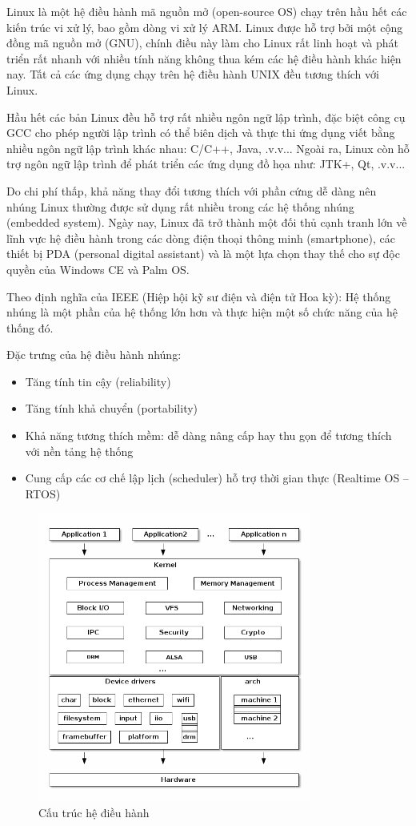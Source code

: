 
Linux là một hệ điều hành mã nguồn mở (open-source OS) chạy trên hầu hết các kiến trúc vi xử lý, bao gồm dòng vi xử lý ARM. Linux được hỗ trợ bởi một cộng đồng mã nguồn mở (GNU), chính điều này làm cho Linux rất linh hoạt và phát triển rất nhanh với nhiều tính năng không thua kém các hệ điều hành khác hiện nay. Tất cả các ứng dụng chạy trên hệ điều hành UNIX đều tương thích với Linux.

Hầu hết các bản Linux đều hỗ trợ rất nhiều ngôn ngữ lập trình, đặc biệt công cụ GCC cho phép người lập trình có thể biên dịch và thực thi ứng dụng viết bằng nhiều ngôn ngữ lập trình khác nhau: C/C++, Java, .v.v... Ngoài ra, Linux còn hỗ trợ ngôn ngữ lập trình để phát triển các ứng dụng đồ họa như: JTK+, Qt, .v.v...

Do chi phí thấp, khả năng thay đổi tương thích với phần cứng dễ dàng nên nhúng Linux thường được sử dụng rất nhiều trong các hệ thống nhúng (embedded system). Ngày nay, Linux đã trở thành một đối thủ cạnh tranh lớn về lĩnh vực hệ điều hành trong các dòng điện thoại thông minh (smartphone), các thiết bị PDA (personal digital assistant) và là một lựa chọn thay thế cho sự độc quyền của Windows CE và Palm OS.

Theo định nghĩa của IEEE (Hiệp hội kỹ sư điện và điện tử Hoa kỳ): Hệ thống nhúng là một phần của hệ thống lớn hơn và thực hiện một số chức năng của hệ thống đó.

Đặc trưng của hệ điều hành nhúng:
\begin{itemize}
	\item Tăng tính tin cậy (reliability)
	\item Tăng tính khả chuyển (portability)
	\item Khả năng tương thích mềm: dễ dàng nâng cấp hay thu gọn để tương thích với nền tảng hệ thống
	\item Cung cấp các cơ chế lập lịch (scheduler) hỗ trợ thời gian thực (Realtime OS – RTOS)
\end{itemize}
\begin{figure}[H]
	\centering
	\includegraphics[width=0.8\textwidth]{../images/cau-truc-linux.png}
	\caption{Cấu trúc hệ điều hành}
\end{figure}
